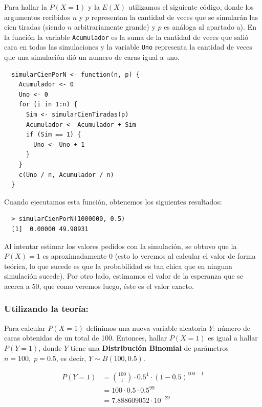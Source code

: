 \documentclass[11pt]{article}
\begin{document}
Para hallar la $ P(X = 1) $ y la $ E(X) $ utilizamos el siguiente código, 
donde los argumentos recibidos $ n $ y $ p $ representan la cantidad de veces
que se simularán las cien tiradas (siendo $n$ arbitrariamente grande) y $p$
es análoga al apartado a). En la función la variable \texttt{Acumulador}
es la suma de la cantidad de veces que salió cara en todas las simulaciones
y la variable \texttt{Uno} representa la cantidad de veces que una simulación
dió un numero de caras igual a uno.

\begin{verbatim}
  simularCienPorN <- function(n, p) {
    Acumulador <- 0
    Uno <- 0
    for (i in 1:n) {
      Sim <- simularCienTiradas(p)
      Acumulador <- Acumulador + Sim
      if (Sim == 1) {
        Uno <- Uno + 1
      }
    }
    c(Uno / n, Acumulador / n)
  }
\end{verbatim}

Cuando ejecutamos esta función, obtenemos los siguientes resultados:

\begin{verbatim}
  > simularCienPorN(1000000, 0.5)
  [1]  0.00000 49.98931
\end{verbatim}

Al intentar estimar los valores pedidos con la simulación, se obtuvo que
la $ P(X) = 1 $ es aproximadamente 0 (esto lo veremos al calcular el valor
de forma teórica, lo que sucede es que la probabilidad es tan chica que en
ninguna simulación sucede). Por otro lado, estimamos el valor de la esperanza
que se acerca a 50, que como veremos luego, éste es el valor exacto.

\subsubsection*{Utilizando la teoría:}

Para calcular $ P(X = 1) $ definimos una nueva variable aleatoria
$ Y $: número de caras obtenidas de un total de 100. Entonces, hallar
$ P(X = 1) $ es igual a hallar $ P(Y = 1) $, donde $ Y $ tiene una \textbf{Distribución
Binomial} de parámetros $ n = 100, \; p = 0.5 $, es decir, $ Y \sim B(100, 0.5) $.

\begin{align*}
  P(Y = 1) &= \binom{100}{1} \cdot 0.5^1 \cdot (1 - 0.5)^{100 - 1} \\
           &= 100 \cdot 0.5 \cdot 0.5^{99} \\
           &= 7.888609052 \cdot 10^{-29}
\end{align*}
\end{document}
